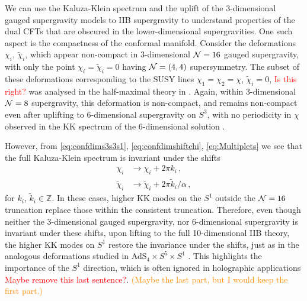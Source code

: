 \documentclass[a4paper, 11pt]{article}
\numberwithin{equation}{section}
\newcommand{\ts}[1]{\widetilde{#1}}
\newcommand{\+}{\oplus}
\newcommand{\EM}[1]{\textcolor{red}{#1}}
\newcommand{\CE}[1]{\textcolor{darkorange}{#1}}
\begin{document}
We can use the Kaluza-Klein spectrum and the uplift of the 3-dimensional gauged supergravity models to IIB supergravity to understand properties of the dual CFTs that are obscured in the lower-dimensional supergravities. One such aspect is the compactness of the conformal manifold. Consider the deformations $\chi_i$, $\ts{\chi}_i$, which appear non-compact in 3-dimensional ${\cal N}=16$ gauged supergravity, with only the point $\chi_i = \ts{\chi}_i = 0$ having ${\cal N}=(4,4)$ supersymmetry. The subset of these deformations corresponding to the SUSY lines $\chi_1 = \chi_2 = \chi$, $\ts{\chi}_i = 0$, \EM{Is this right?} was analysed in the half-maximal theory in \cite{Eloy:2021fhc}. Again, within 3-dimensional ${\cal N}=8$ supergravity, this deformation is non-compact, and remains non-compact even after uplifting to 6-dimensional supergravity on $S^3$, with no periodicity in $\chi$ observed in the KK spectrum of the 6-dimensional solution \cite{Eloy:2021fhc}.

However, from  \eqref{eq:confdims3s3s1}, \eqref{eq:confdimshiftchi}, \eqref{eq:Multiplets} we see that the full Kaluza-Klein spectrum is invariant under the shifts
\begin{equation} \label{eq:ShiftSymmetries}
	\begin{split}
		\chi_i &\rightarrow \chi_i + 2\pi k_i\,, \\
		\ts{\chi}_i &\rightarrow \ts{\chi}_i + 2\pi \ts{k}_i/\alpha \,,
	\end{split}
\end{equation}
for $k_i$, $\ts{k}_i \in \mathbb{Z}$. In these cases, higher KK modes on the $S^1$ outside the ${\cal N}=16$ truncation replace those within the consistent truncation. Therefore, even though neither the 3-dimensional gauged supergravity, nor 6-dimensional supergravity is invariant under these shifts, upon lifting to the full 10-dimensional IIB theory, the higher KK modes on $S^1$ restore the invariance under the shifts, just as in the analogous deformations studied in AdS$_4 \times S^5 \times S^1$ \cite{Giambrone:2021zvp,Giambrone:2021wsm}. This highlights the importance of the $S^1$ direction, which is often ignored in holographic applications \EM{Maybe remove this last sentence?}. \CE{(Maybe the last part, but I would keep the first part.)}

\end{document}
